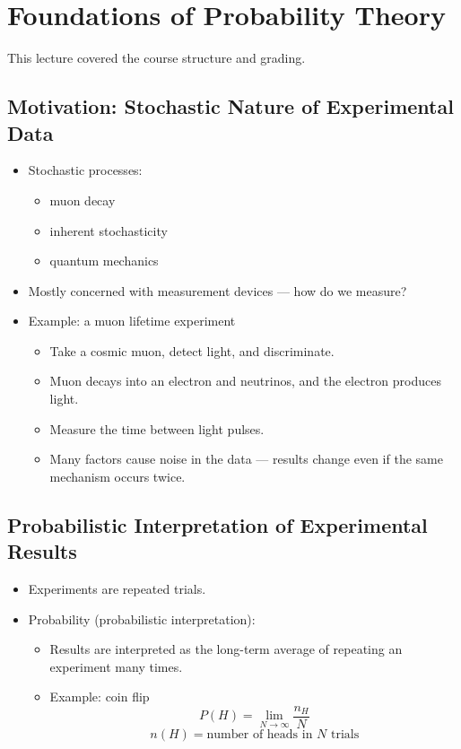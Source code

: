 \section{Foundations of Probability Theory}

This lecture covered the course structure and grading.

\subsection{Motivation: Stochastic Nature of Experimental Data}

\begin{itemize}
    \item Stochastic processes:
          \begin{itemize}
              \item muon decay
              \item inherent stochasticity
              \item quantum mechanics
          \end{itemize}
    \item Mostly concerned with measurement devices — how do we measure?
    \item Example: a muon lifetime experiment
          \begin{itemize}
              \item Take a cosmic muon, detect light, and discriminate.
              \item Muon decays into an electron and neutrinos, and the electron produces light.
              \item Measure the time between light pulses.
              \item Many factors cause noise in the data — results change even if the same mechanism occurs twice.
          \end{itemize}
\end{itemize}

\subsection{Probabilistic Interpretation of Experimental Results}

\begin{itemize}
    \item Experiments are repeated trials.
    \item Probability (probabilistic interpretation):
          \begin{itemize}
              \item Results are interpreted as the long-term average of repeating an experiment many times.
              \item Example: coin flip
                    \[ P(H) = \lim_{N\to\infty} \frac{n_H}{N} \]
                    \[ n(H) = \text{number of heads in $N$ trials} \]
          \end{itemize}
\end{itemize}

